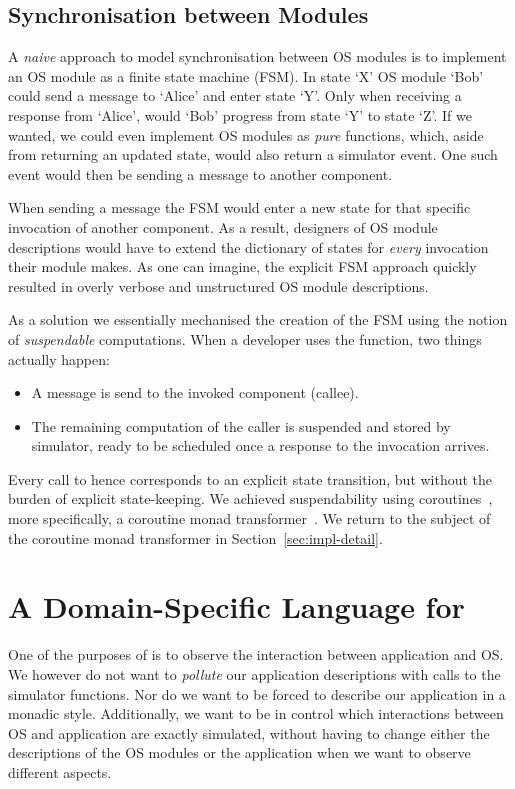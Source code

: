 \subsection{Synchronisation between Modules}
A \emph{naive} approach to model synchronisation between OS modules is to implement an OS module as a finite state machine (FSM).
In state `X' OS module `Bob' could send a message to `Alice' and enter state `Y'.
Only when receiving a response from `Alice', would `Bob' progress from state `Y' to state `Z'.
If we wanted, we could even implement OS modules as \emph{pure} functions, which, aside from returning an updated state, would also return a simulator event.
One such event would then be sending a message to another component.

When sending a message the FSM would enter a new state for that specific invocation of another component.
As a result, designers of OS module descriptions would have to extend the dictionary of states for \emph{every} invocation their module makes.
As one can imagine, the explicit FSM approach quickly resulted in overly verbose and unstructured OS module descriptions.

As a solution we essentially mechanised the creation of the FSM using the notion of \emph{suspendable} computations.
When a developer uses the  function, two things actually happen:
\begin{itemize}
  \item A message is send to the invoked component (callee).
  \item The remaining computation of the caller is suspended and stored by simulator, ready to be scheduled once a response to the invocation arrives.
\end{itemize}
Every call to  hence corresponds to an explicit state transition, but without the burden of explicit state-keeping.
We achieved suspendability using coroutines~\cite{coroutines}, more specifically, a coroutine monad transformer~\cite{cmt}.
We return to the subject of the coroutine monad transformer in Section~\ref{sec:impl-detail}.

\section{A Domain-Specific Language for \soosim}
\label{sec:dsl}
One of the purposes of \soosim is to observe the interaction between application and OS.
We however do not want to \emph{pollute} our application descriptions with calls to the simulator functions.
Nor do we want to be forced to describe our application in a monadic style.
Additionally, we want to be in control which interactions between OS and application are exactly simulated, without having to change either the descriptions of the OS modules or the application when we want to observe different aspects.

